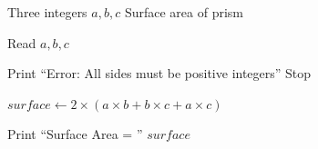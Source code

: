 \begin{algorithm}
\caption{Surface Area of a Prism}
\begin{algorithmic}[1]

\REQUIRE Three integers $a, b, c$
\ENSURE Surface area of prism

\STATE Read $a, b, c$

    \STATE Print ``Error: All sides must be positive integers''
    \STATE Stop
\ENDIF

\STATE $surface \gets 2 \times (a \times b + b \times c + a \times c)$

\STATE Print ``Surface Area = '' $surface$

\end{algorithmic}
\end{algorithm}